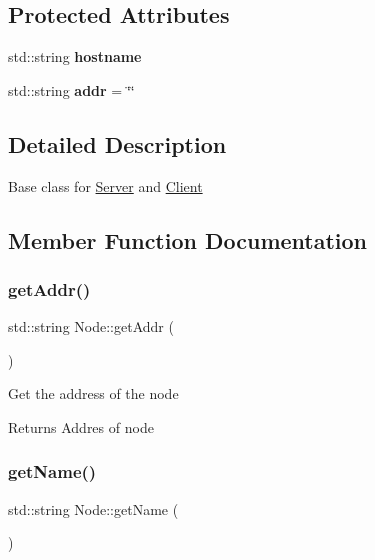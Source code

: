 \subsection*{Protected Attributes}
\begin{DoxyCompactItemize}
\item 
\mbox{\label{classNode_a9f5a57e15567a0b92cb8d25bcec7bd24}} 
std\+::string {\bfseries hostname}
\item 
\mbox{\label{classNode_ab6574c1b47841ed7a6428e4803c42d46}} 
std\+::string {\bfseries addr} = \char`\"{}\char`\"{}
\end{DoxyCompactItemize}


\subsection{Detailed Description}
Base class for \mbox{\hyperlink{classServer}{Server}} and \mbox{\hyperlink{classClient}{Client}} 

\subsection{Member Function Documentation}
\mbox{\label{classNode_afccc68447572f5a9d19763984739117d}} 
\subsubsection{\texorpdfstring{get\+Addr()}{getAddr()}}
{\footnotesize\ttfamily std\+::string Node\+::get\+Addr (\begin{DoxyParamCaption}{ }\end{DoxyParamCaption})\hspace{0.3cm}{\ttfamily [inline]}}

Get the address of the node

\begin{DoxyReturn}{Returns}
Addres of node 
\end{DoxyReturn}
\mbox{\label{classNode_a3e5ac6b5881a3a9d82f3112953c1e546}} 
\subsubsection{\texorpdfstring{get\+Name()}{getName()}}
{\footnotesize\ttfamily std\+::string Node\+::get\+Name (\begin{DoxyParamCaption}{ }\end{DoxyParamCaption})\hspace{0.3cm}{\ttfamily [inline]}}

